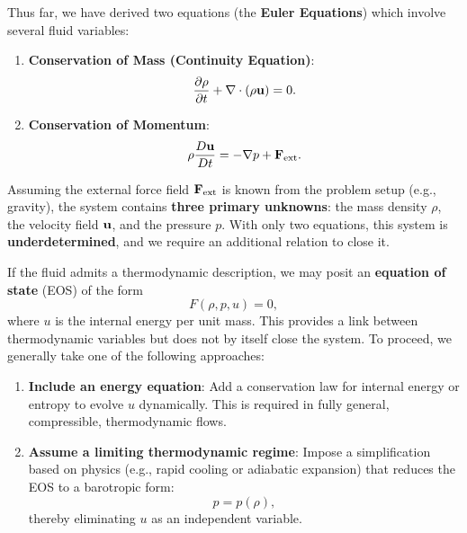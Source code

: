 Thus far, we have derived two equations (the \textbf{Euler Equations}) which involve several fluid variables:

\begin{enumerate}
    \item \textbf{Conservation of Mass (Continuity Equation)}:
    \[
    \frac{\partial \rho}{\partial t} + \nabla \cdot ( \rho {\bf u} ) = 0.
    \]

    \item \textbf{Conservation of Momentum}:
    \[
    \rho \frac{D {\bf u}}{D t} = - \nabla p + {\bf F}_{\rm ext}.
    \]
\end{enumerate}

Assuming the external force field ${\bf F}_{\rm ext}$ is known from the problem setup (e.g., gravity), the system contains \textbf{three primary unknowns}: the mass density $\rho$, the velocity field ${\bf u}$, and the pressure $p$. With only two equations, this system is \textbf{underdetermined}, and we require an additional relation to close it.

\begin{ideabox}
    If the fluid admits a thermodynamic description, we may posit an \textbf{equation of state} (EOS) of the form
    \[
    F(\rho, p, u) = 0,
    \]
    where \( u \) is the internal energy per unit mass. This provides a link between thermodynamic variables but does not by itself close the system. To proceed, we generally take one of the following approaches:

    \begin{enumerate}
        \item \textbf{Include an energy equation}: Add a conservation law for internal energy or entropy to evolve \( u \) dynamically. This is required in fully general, compressible, thermodynamic flows.
        
        \item \textbf{Assume a limiting thermodynamic regime}: Impose a simplification based on physics (e.g., rapid cooling or adiabatic expansion) that reduces the EOS to a barotropic form:
        \[
        p = p(\rho),
        \]
        thereby eliminating \( u \) as an independent variable.
    \end{enumerate}
\end{ideabox}

